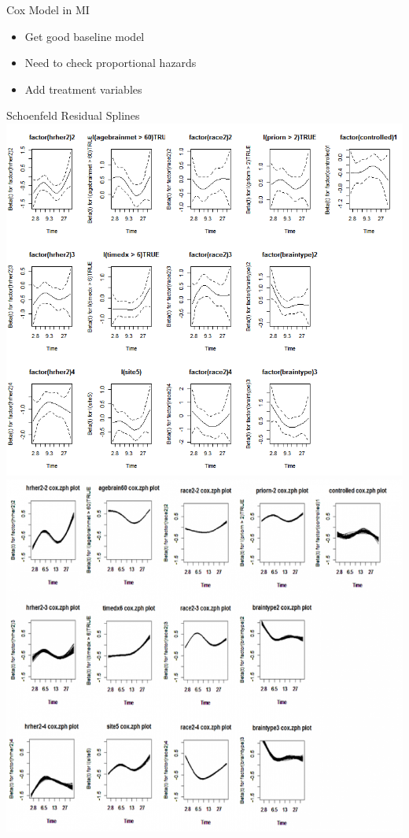 \begin{frame}{Cox Model in MI}
\begin{itemize}
 \item Get good baseline model
 \item Need to check proportional hazards
 \item Add treatment variables
\end{itemize}
\end{frame}

\begin{frame}{Schoenfeld Residual Splines}
\includegraphics[width=.5\textwidth]{ac_schoenfeld}%
\includegraphics[width=.5\textwidth]{mi_schoenfeld} 
\end{frame}

